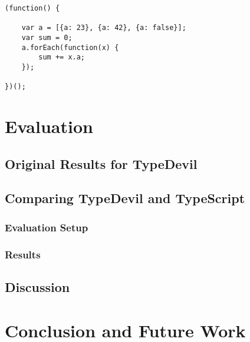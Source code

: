 \documentclass[runningheads,a4paper]{llncs}
\begin{document}
\medskip\medskip
\lstset{language=javascript}
\begin{minipage}{\linewidth}
\begin{lstlisting}[frame=single, caption=inconsistent\_foreach.js]
(function() {
    
    var a = [{a: 23}, {a: 42}, {a: false}];
    var sum = 0;
    a.forEach(function(x) {
        sum += x.a;
    });
    
})();
\end{lstlisting}
\end{minipage}



\section{Evaluation}

\subsection{Original Results for TypeDevil}

\subsection{Comparing TypeDevil and TypeScript} \label{comparison}

\subsubsection{Evaluation Setup}

\subsubsection{Results}


\subsection{Discussion}



\section{Conclusion and Future Work}


{}

\end{document}
